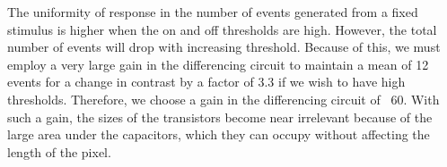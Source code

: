 The uniformity of response in the number of events generated from a fixed stimulus is higher when the on and off
thresholds are high. However, the total number of events will drop with increasing threshold. 
Because of this, we must employ a very large gain in the differencing circuit to maintain a mean of 12 events
for a change in contrast by a factor of 3.3 if we wish to have high thresholds.
Therefore, we choose a gain in the differencing circuit of ~60. With such a gain, the sizes of the 
transistors become near irrelevant because of the large area under the capacitors, which they can occupy without
affecting the length of the pixel.


